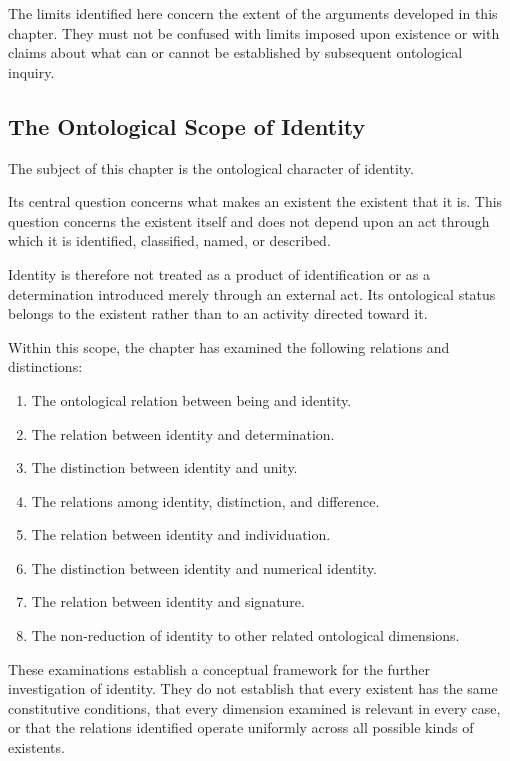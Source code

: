The limits identified here concern the extent of the
arguments developed in this chapter. They must not be
confused with limits imposed upon existence or with claims
about what can or cannot be established by subsequent
ontological inquiry.

\subsection{The Ontological Scope of Identity}

The subject of this chapter is the ontological character
of identity.

Its central question concerns what makes an existent the
existent that it is. This question concerns the existent
itself and does not depend upon an act through which it is
identified, classified, named, or described.

Identity is therefore not treated as a product of
identification or as a determination introduced merely
through an external act. Its ontological status belongs
to the existent rather than to an activity directed toward it.

Within this scope, the chapter has examined the following
relations and distinctions:

\begin{enumerate}
    \item The ontological relation between being and identity.
    \item The relation between identity and determination.
    \item The distinction between identity and unity.
    \item The relations among identity, distinction, and difference.
    \item The relation between identity and individuation.
    \item The distinction between identity and numerical identity.
    \item The relation between identity and signature.
    \item The non-reduction of identity to other related
    ontological dimensions.
\end{enumerate}

These examinations establish a conceptual framework for
the further investigation of identity. They do not establish
that every existent has the same constitutive conditions,
that every dimension examined is relevant in every case,
or that the relations identified operate uniformly across
all possible kinds of existents.

